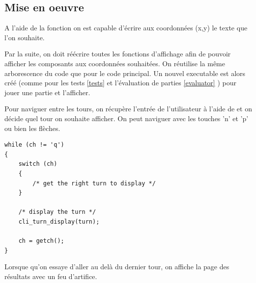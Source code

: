 \subsection{Mise en oeuvre}
A l'aide de la fonction  on est capable d'écrire aux coordonnées (x,y) le texte que l'on souhaite.

Par la suite, on doit réécrire toutes les fonctions d'affichage afin de pouvoir afficher les composants aux coordonnées souhaitées. On réutilise la même arborescence du code que pour le code principal. Un nouvel executable  est alors créé (comme pour les tests \ref{tests} et l'évaluation de parties \ref{evaluator} ) pour jouer une partie et l'afficher.  

Pour naviguer entre les tours, on récupère l'entrée de l'utilisateur à l'aide de  et on décide quel tour on souhaite afficher. On peut naviguer avec les touches 'n' et 'p' ou bien les flèches.

\begin{lstlisting}[frame=single, caption={Navigation dans les tours de la partie}]
while (ch != 'q')
{
    switch (ch)
    {
        /* get the right turn to display */
    } 
    
    /* display the turn */
    cli_turn_display(turn);

    ch = getch();
}
\end{lstlisting}

\begin{summary}
Lorsque qu'on essaye d'aller au delà du dernier tour, on affiche la page des résultats avec un feu d'artifice.
\end{summary}